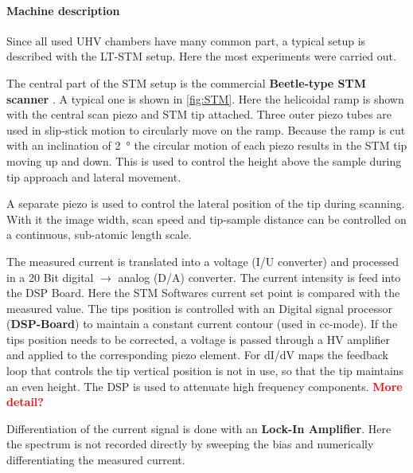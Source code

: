 \paragraph{Machine description}
Since all used UHV chambers have many common part, a typical setup is described with the LT-STM setup. Here the most experiments were carried out.

The central part of the STM setup is the commercial \textbf{Beetle-type STM scanner} \cite{zoephel_aufbau_2000}. A typical one is shown in \ref{fig:STM}. Here the helicoidal ramp is shown with the central scan piezo and STM tip attached. Three outer piezo tubes are used in slip-stick motion to circularly move on the ramp. Because the ramp is cut with an inclination of \SI{2}{\degree} the circular motion of each piezo results in the STM tip moving up and down. This is used to control the height above the sample during tip approach and lateral movement.

A separate piezo is used to control the lateral position of the tip during scanning. With it the image width, scan speed and tip-sample distance can be controlled on a continuous, sub-atomic length scale.

The measured current is translated into a voltage (I/U converter) and processed in a 20 Bit digital $\rightarrow$ analog (D/A) converter. The current intensity is feed into the DSP Board. Here the STM Softwares current set point is compared with the measured value. The tips position is controlled with an Digital signal processor (\textbf{DSP-Board}) to maintain a constant current contour (used in cc-mode). If the tips position needs to be corrected, a voltage is passed through a HV amplifier and applied to the corresponding piezo element. For dI/dV maps the feedback loop that controls the tip vertical position is not in use, so that the tip maintains an even height. The DSP is used to attenuate high frequency components. \textcolor{red}{\textbf{ More detail?}}

Differentiation of the current signal is done with an \textbf{Lock-In Amplifier}. Here the spectrum is not recorded directly by sweeping the bias and numerically differentiating the measured current. 
	
